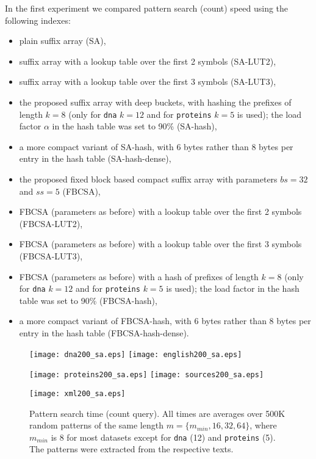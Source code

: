\documentclass{cai}
\begin{document}
In the first experiment we compared pattern search (count) speed 
using the following indexes:
\begin{itemize}
\item plain suffix array (SA),
\item suffix array with a lookup table over the first 2 symbols (SA-LUT2),
\item suffix array with a lookup table over the first 3 symbols (SA-LUT3),
\item the proposed suffix array with deep buckets, 
      with hashing the prefixes of length $k = 8$ 
      (only for \texttt{dna} $k = 12$ and for \texttt{proteins} $k = 5$ is used); 
      the load factor $\alpha$ in the hash table was set to 90\% (SA-hash),
\item a more compact variant of SA-hash, with 6 bytes rather than 8 bytes per 
      entry in the hash table (SA-hash-dense),
\item the proposed fixed block based compact suffix array with parameters $bs = 32$ 
      and $ss = 5$ (FBCSA),
\item FBCSA (parameters as before) with a lookup table over the first 2 symbols 
      (FBCSA-LUT2),
\item FBCSA (parameters as before) with a lookup table over the first 3 symbols 
      (FBCSA-LUT3),
\item FBCSA (parameters as before) with a hash of prefixes of length $k = 8$ 
      (only for \texttt{dna} $k = 12$ and for \texttt{proteins} $k = 5$ is used);
      the load factor in the hash table was set to 90\% (FBCSA-hash),
\item a more compact variant of FBCSA-hash, with 6 bytes rather than 8 bytes per 
      entry in the hash table (FBCSA-hash-dense).
\end{itemize}


\begin{figure}
\centerline{
\texttt{[image: dna200\_sa.eps]}
\texttt{[image: english200\_sa.eps]}
}
\centerline{
\texttt{[image: proteins200\_sa.eps]}
\texttt{[image: sources200\_sa.eps]}
}
\centerline{
\texttt{[image: xml200\_sa.eps]}
}
\caption[Results]
{Pattern search time (count query). 
All times are averages over 500K random patterns of the same length 
$m = \{m_{min}, 16, 32, 64\}$, where $m_{min}$ is 8 for most datasets 
except for \texttt{dna} (12) and \texttt{proteins} (5). 
The patterns were extracted from the respective texts.}
\label{fig:times1a}
\end{figure}
\end{document}
